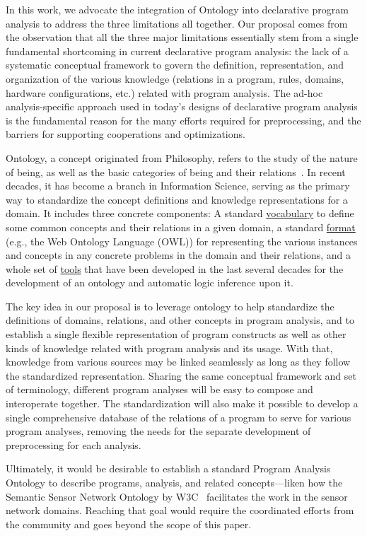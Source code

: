 In this work, we advocate the integration of Ontology into declarative
program analysis to address the three limitations all together. Our
proposal comes from the observation that all the three major
limitations essentially stem from a single fundamental shortcoming in
current declarative program analysis: the lack of a systematic
conceptual framework to govern the definition, representation, and
organization of the various knowledge (relations in a program, rules,
domains, hardware configurations, etc.) related with program
analysis. The ad-hoc analysis-specific approach used in today's
designs of declarative program analysis is the fundamental reason for
the many efforts required for preprocessing, and the barriers for
supporting cooperations and optimizations.

Ontology, a concept originated from Philosophy, refers to the study of
the nature of being, as well as the basic categories of being and
their relations~\cite{noy2001ontology}. In recent decades, it has
become a branch in Information Science, serving as the primary way to
standardize the concept definitions and knowledge representations for
a domain. It includes three concrete components: A
standard \underline{vocabulary} to define some common concepts and
their relations in a given domain, a standard \underline{format}
(e.g., the Web Ontology Language (OWL)) for representing the
various instances and concepts in any concrete problems in the domain
and their relations, and a whole set of \underline{tools} that have
been developed in the last several decades for the development of an
ontology and automatic logic inference upon it.

The key idea in our proposal is to leverage ontology to help
standardize the definitions of domains, relations, and other concepts
in program analysis, and to establish a single flexible representation
of program constructs as well as other kinds of knowledge related with
program analysis and its usage. With that, knowledge from various
sources may be linked seamlessly as long as they follow the
standardized representation. Sharing the same conceptual framework and
set of terminology, different program analyses will be easy to compose
and interoperate together. The standardization will also make it
possible to develop a single comprehensive database of the relations
of a program to serve for various program analyses, removing the needs
for the separate development of preprocessing for each analysis.

Ultimately, it would be desirable to establish a standard Program
Analysis Ontology to describe programs, analysis, and related
concepts---liken how the Semantic Sensor Network Ontology by
W3C~\cite{Compton201225} 
facilitates the work
in the sensor network domains. Reaching that goal would require the
coordinated efforts from the community and goes beyond the scope of this
paper.

